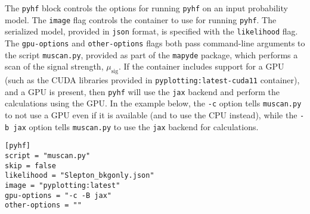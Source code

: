 \documentclass{article}
\newcommand{\mapyde}{\texttt{mapyde}}
\newcommand{\pyhf}{\texttt{pyhf}}
\newcommand{\musig}{\ensuremath{\mu_{\mathrm{sig}}}}
\newcommand{\json}{\texttt{json}}
\newcommand{\toml}{\textsc{toml}}
\begin{document}
The \texttt{pyhf} block controls the options for running \pyhf{} on an input probability model.  The \texttt{image} flag controls the container to use for running \pyhf.  The serialized model, provided in \json{} format, is specified with the \texttt{likelihood} flag.  The \texttt{gpu-options} and \texttt{other-options} flags both pass command-line arguments to the script \texttt{muscan.py}, provided as part of the \mapyde{} package, which performs a scan of the signal strength, \musig.  If the container includes support for a GPU (such as the CUDA libraries provided in \texttt{pyplotting:latest-cuda11} container), and a GPU is present, then \pyhf{} will use the \texttt{jax} backend and perform the calculations using the GPU.  In the example below, the \texttt{-c} option tells \texttt{muscan.py} to not use a GPU even if it is available (and to use the CPU instead), while the \texttt{-b jax} option tells \texttt{muscan.py} to use the \texttt{jax} backend for calculations.

\begin{listing}[H]
	\begin{verbatim}
[pyhf]
script = "muscan.py"
skip = false
likelihood = "Slepton_bkgonly.json"
image = "pyplotting:latest"
gpu-options = "-c -B jax"
other-options = ""
  \end{verbatim}
	\caption{The \texttt{pyhf} block of an example \toml{} configuration file for generating slepton events.}
	\label{slepton-config-pyhf}
\end{listing}
\end{document}
